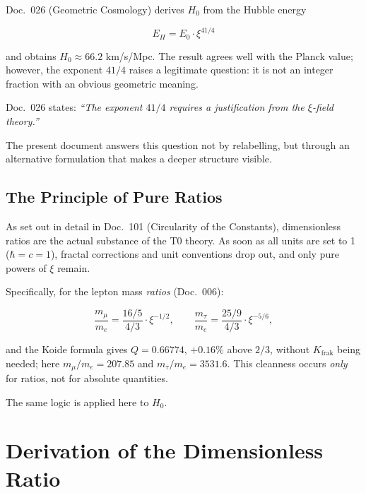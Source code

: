 Doc.~026 (Geometric Cosmology) derives $H_0$ from the Hubble energy

\begin{equation}
    E_H = E_0 \cdot \xi^{41/4}
    \label{eq:EH_026}
\end{equation}

and obtains $H_0 \approx 66.2$ km/s/Mpc. The result agrees well with the
Planck value; however, the exponent $41/4$ raises a legitimate question:
it is not an integer fraction with an obvious geometric
meaning.

Doc.~026 states: \textit{``The exponent $41/4$ requires a justification
from the $\xi$-field theory.''}

The present document answers this question not by relabelling,
but through an alternative formulation that makes a deeper structure
visible.

\subsection{The Principle of Pure Ratios}

As set out in detail in Doc.~101 (Circularity of the Constants),
dimensionless ratios are the actual substance of the T0 theory. As soon as
all units are set to 1 ($\hbar = c = 1$), fractal corrections
and unit conventions drop out, and only pure powers of $\xi$ remain.

Specifically, for the lepton mass \emph{ratios} (Doc.~006):

\begin{equation}
    \frac{m_\mu}{m_e} = \frac{16/5}{4/3} \cdot \xi^{-1/2}, \qquad
    \frac{m_\tau}{m_e} = \frac{25/9}{4/3} \cdot \xi^{-5/6},
\end{equation}

and the Koide formula gives $Q = 0.66774$, $+0.16\%$ above $2/3$, without $K_\text{frak}$
being needed; here $m_\mu/m_e = 207.85$ and $m_\tau/m_e = 3531.6$. This cleanness occurs \emph{only} for ratios,
not for absolute quantities.

The same logic is applied here to $H_0$.

\section{Derivation of the Dimensionless Ratio}
\label{sec:herleitung}

